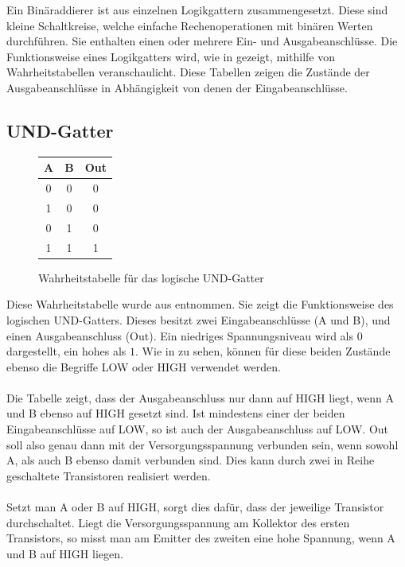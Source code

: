 Ein Binäraddierer ist aus einzelnen Logikgattern zusammengesetzt. Diese sind kleine Schaltkreise, welche einfache Rechenoperationen mit binären Werten durchführen. Sie enthalten einen oder mehrere Ein- und Ausgabeanschlüsse. Die Funktionsweise eines Logikgatters wird, wie in \cite{rigotti2003digitale} gezeigt, mithilfe von Wahrheitstabellen veranschaulicht. Diese Tabellen zeigen die Zustände der Ausgabeanschlüsse in Abhängigkeit von denen der Eingabeanschlüsse.

\subsection{UND-Gatter}
\begin{figure}[h]
	\centering
	\hspace{1cm}
	\begin{tabular}{|c|c|c|}
		\hline
		\textbf{A} & \textbf{B} & \textbf{Out} \\
		\hline
		0 & 0 & 0 \\
		1 & 0 & 0 \\
		0 & 1 & 0 \\
		1 & 1 & 1 \\
		\hline
	\end{tabular}
	\caption{Wahrheitstabelle für das logische UND-Gatter}
\end{figure}
Diese Wahrheitstabelle wurde aus \cite{rigotti2003digitale} entnommen. Sie zeigt die Funktionsweise des logischen UND-Gatters. Dieses besitzt zwei Eingabeanschlüsse (A und B), und einen Ausgabeanschluss (Out). Ein niedriges Spannungsniveau wird als $0$ dargestellt, ein hohes als $1$. Wie in \cite{neuser2008erstellung} zu sehen, können für diese beiden Zustände ebenso die Begriffe \glqq{}LOW\grqq{} oder \glqq{}HIGH\grqq{} verwendet werden.\\\\
Die Tabelle zeigt, dass der Ausgabeanschluss nur dann auf HIGH liegt, wenn A und B ebenso auf HIGH gesetzt sind. Ist mindestens einer der beiden Eingabeanschlüsse auf LOW, so ist auch der Ausgabeanschluss auf LOW. Out soll also genau dann mit der Versorgungsspannung verbunden sein, wenn sowohl A, als auch B ebenso damit verbunden sind. Dies kann durch zwei in Reihe geschaltete Transistoren realisiert werden.\\\\
Setzt man A oder B auf HIGH, sorgt dies dafür, dass der jeweilige Transistor durchschaltet. Liegt die Versorgungsspannung am Kollektor des ersten Transistors, so misst man am Emitter des zweiten eine hohe Spannung, wenn A und B auf HIGH liegen.\\
